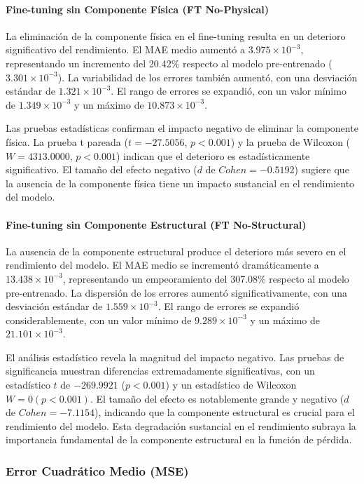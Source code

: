 \paragraph{Fine-tuning sin Componente Física (FT No-Physical)}
La eliminación de la componente física en el fine-tuning resulta en un deterioro significativo del rendimiento. El MAE medio aumentó a $3.975 \times 10^{-3}$, representando un incremento del 20.42\% respecto al modelo pre-entrenado ($3.301 \times 10^{-3}$). La variabilidad de los errores también aumentó, con una desviación estándar de $1.321 \times 10^{-3}$. El rango de errores se expandió, con un valor mínimo de $1.349 \times 10^{-3}$ y un máximo de $10.873 \times 10^{-3}$.

Las pruebas estadísticas confirman el impacto negativo de eliminar la componente física. La prueba t pareada ($t = -27.5056$, $p < 0.001$) y la prueba de Wilcoxon ($W = 4313.0000$, $p < 0.001$) indican que el deterioro es estadísticamente significativo. El tamaño del efecto negativo ($d$ de $Cohen = -0.5192$) sugiere que la ausencia de la componente física tiene un impacto sustancial en el rendimiento del modelo.

\paragraph{Fine-tuning sin Componente Estructural (FT No-Structural)}
La ausencia de la componente estructural produce el deterioro más severo en el rendimiento del modelo. El MAE medio se incrementó dramáticamente a $13.438 \times 10^{-3}$, representando un empeoramiento del 307.08\% respecto al modelo pre-entrenado. La dispersión de los errores aumentó significativamente, con una desviación estándar de $1.559 \times 10^{-3}$. El rango de errores se expandió considerablemente, con un valor mínimo de $9.289 \times 10^{-3}$ y un máximo de $21.101 \times 10^{-3}$.

El análisis estadístico revela la magnitud del impacto negativo. Las pruebas de significancia muestran diferencias extremadamente significativas, con un estadístico $t$ de $-269.9921$ ($p < 0.001$) y un estadístico de Wilcoxon $W = 0 (p < 0.001)$. El tamaño del efecto es notablemente grande y negativo ($d$ de $Cohen = -7.1154$), indicando que la componente estructural es crucial para el rendimiento del modelo. Esta degradación sustancial en el rendimiento subraya la importancia fundamental de la componente estructural en la función de pérdida.

\subsubsection{Error Cuadrático Medio (MSE)}

